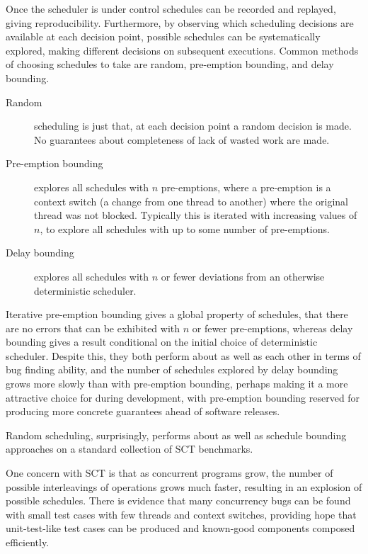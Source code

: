 Once the scheduler is under control schedules can be recorded and
replayed, giving reproducibility. Furthermore, by observing which
scheduling decisions are available at each decision point, possible
schedules can be systematically explored, making different decisions
on subsequent executions. Common methods of choosing schedules to take
are random, pre-emption bounding\cite{pbound}, and delay
bounding\cite{dbound}.

\begin{description}
  \item[Random] scheduling is just that, at each decision point a
    random decision is made. No guarantees about completeness of lack
    of wasted work are made.

  \item[Pre-emption bounding] explores all schedules with $n$
    pre-emptions, where a pre-emption is a context switch (a change
    from one thread to another) where the original thread was not
    blocked. Typically this is iterated with increasing values of $n$,
    to explore all schedules with up to some number of pre-emptions.

  \item[Delay bounding] explores all schedules with $n$ or fewer
    deviations from an otherwise deterministic scheduler.
\end{description}

Iterative pre-emption bounding gives a global property of schedules,
that there are no errors that can be exhibited with $n$ or fewer
pre-emptions, whereas delay bounding gives a result conditional on the
initial choice of deterministic scheduler. Despite this, they both
perform about as well as each other in terms of bug finding
ability\cite{empirical}, and the number of schedules explored by delay
bounding grows more slowly than with pre-emption
bounding\cite{dbound}, perhaps making it a more attractive choice for
during development, with pre-emption bounding reserved for producing
more concrete guarantees ahead of software releases.

Random scheduling, surprisingly, performs about as well as schedule
bounding approaches on a standard collection of SCT
benchmarks\cite{empirical}.

One concern with SCT is that as concurrent programs grow, the number
of possible interleavings of operations grows much faster, resulting
in an explosion of possible schedules. There is evidence that many
concurrency bugs can be found with small test cases with few threads
and context switches\cite{pbound, dbound, empirical}, providing hope
that unit-test-like test cases can be produced and known-good
components composed efficiently.

